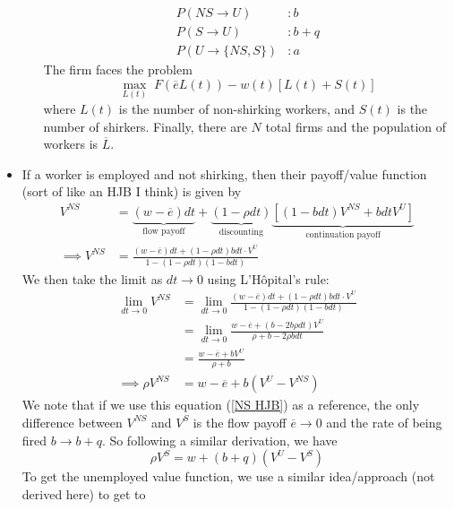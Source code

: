 \documentclass[12pt]{article}
\begin{document}
\begin{itemize}
\begin{itemize}
        \[\begin{split}
            P(NS \rightarrow U)&: b \\
            P(S \rightarrow U)&: b+q \\
            P(U \rightarrow \{NS, S\})&: a
        \end{split}\]
        The firm faces the problem
        \[\max_{L(t)}\; F(\overline{e}L(t)) - w(t)[L(t) + S(t)]\]
        where $L(t)$ is the number of non-shirking workers, and $S(t)$ is the number of shirkers. Finally, there are $N$ total firms and the population of workers is $\overline{L}$.
    \end{itemize}
    \item If a worker is employed and not shirking, then their payoff/value function (sort of like an HJB I think) is given by
    \[\begin{split}
        V^{NS} &= \underbrace{(w-\overline{e})dt}_{\text{flow payoff}} + \underbrace{(1-\rho dt)}_{\text{discounting}}\underbrace{\left[(1-bdt)V^{NS} + bdtV^{U}\right]}_{\text{continuation payoff}} \\
        \implies V^{NS} &= \frac{(w-\overline{e})dt + (1-\rho dt)bdt\cdot V^U}{1-(1-\rho dt)(1-b dt)}
    \end{split}\]
    We then take the limit as $dt \to 0$ using L'Hôpital's rule:
    \begin{equation}\label{NS HJB}
        \begin{split}
            \lim_{dt \to 0}V^{NS} &= \lim_{dt \to 0}\frac{(w-\overline{e})dt + (1-\rho dt)bdt\cdot V^U}{1-(1-\rho dt)(1-b dt)} \\
            &= \lim_{dt \to 0} \frac{w-\overline{e} +(b-2b\rho dt)V^U}{\rho + b -2\rho b dt} \\
            &= \frac{w-\overline{e} +bV^U}{\rho + b} \\
            \implies \rho V^{NS} &= w-\overline{e} + b(V^U-V^{NS})
        \end{split}
    \end{equation}
    We note that if we use this equation (\ref{NS HJB}) as a reference, the only difference between $V^{NS}$ and $V^S$ is the flow payoff $\overline{e} \to 0$ and the rate of being fired $b \to b+q$. So following a similar derivation, we have
    \begin{equation}\label{S HJB}
        \rho V^{S} = w + (b+q)(V^U-V^S)
    \end{equation}
    To get the unemployed value function, we use a similar idea/approach (not derived here) to get to

\end{itemize}
\end{document}
